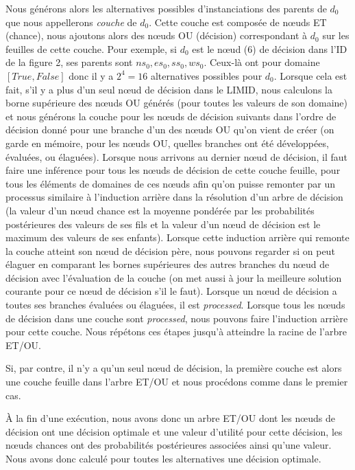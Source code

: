 \documentclass[12pt]{article}
\begin{document}
Nous générons alors les alternatives possibles d'instanciations des parents de $d_0$ que nous appellerons \textit{couche} de $d_0$. Cette couche est composée de nœuds ET (chance), nous ajoutons alors des nœuds OU (décision) correspondant à $d_0$ sur les feuilles de cette couche. Pour exemple, si $d_0$ est le nœud (6) de décision dans l'ID de la figure 2, ses parents sont $ns_0, es_0, ss_0, ws_0$. Ceux-là ont pour domaine $[True, False]$  donc il y a $2^4=16$ alternatives possibles pour $d_0$.
Lorsque cela est fait, s'il y a plus d'un seul nœud de décision dans le LIMID, nous calculons la borne supérieure des nœuds OU générés (pour toutes les valeurs de son domaine) et nous générons la couche pour les nœuds de décision suivants dans l'ordre de décision donné pour une branche d'un des nœuds OU qu'on vient de créer (on garde en mémoire, pour les nœuds OU, quelles branches ont été développées, évaluées, ou élaguées). Lorsque nous arrivons au dernier nœud de décision, il faut faire une inférence pour tous les nœuds de décision de cette couche feuille, pour tous les éléments de domaines de ces nœuds afin qu'on puisse remonter par un processus similaire à l'induction arrière dans la résolution d'un arbre de décision (la valeur d'un nœud chance est la moyenne pondérée par les probabilités postérieures des valeurs de ses fils et la valeur d'un nœud de décision est le maximum des valeurs de ses enfants). Lorsque cette induction arrière qui remonte la couche atteint son nœud de décision père, nous pouvons regarder si on peut élaguer en comparant les bornes supérieures des autres branches du nœud de décision avec l'évaluation de la couche (on met aussi à jour la meilleure solution courante pour ce nœud de décision s'il le faut). Lorsque un nœud de décision a toutes ses branches évaluées ou élaguées, il est \textit{processed}. Lorsque tous les nœuds de décision dans une couche sont \textit{processed}, nous pouvons faire l'induction arrière pour cette couche. Nous répétons ces étapes jusqu'à atteindre la racine de l'arbre ET/OU. 

Si, par contre, il n'y a qu'un seul nœud de décision, la première couche est alors une couche feuille dans l'arbre ET/OU et nous procédons comme dans le premier cas.

À la fin d'une exécution, nous avons donc un arbre ET/OU dont les nœuds de décision ont une décision optimale et une valeur d'utilité pour cette décision, les nœuds chances ont des probabilités postérieures associées ainsi qu'une valeur. Nous avons donc calculé pour toutes les alternatives une décision optimale.
\end{document}
